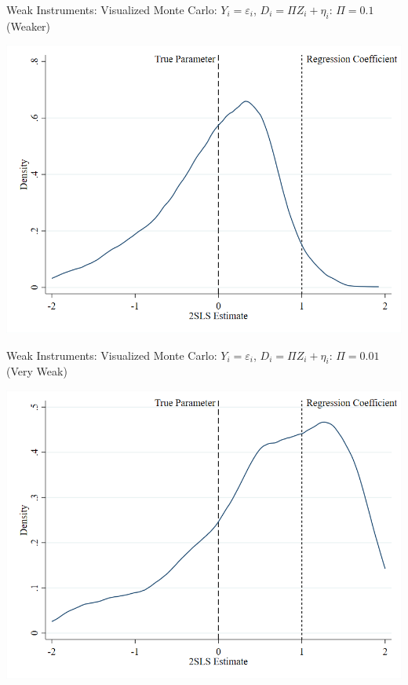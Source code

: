\documentclass{beamer}
\begin{document}
\begin{frame}{Weak Instruments: Visualized}
Monte Carlo: $Y_i=\varepsilon_i$, $D_i=\Pi Z_i+\eta_i$: $\Pi=0.1$ (Weaker)
\begin{center}
\includegraphics[scale=0.35]{./lecture_includes/medpi.png}
\end{center}

\end{frame}

\begin{frame}{Weak Instruments: Visualized}
Monte Carlo: $Y_i=\varepsilon_i$, $D_i=\Pi Z_i+\eta_i$: $\Pi=0.01$ (Very Weak)
\begin{center}
\includegraphics[scale=0.35]{./lecture_includes/weakpi.png}
\end{center}

\end{frame}
\end{document}
